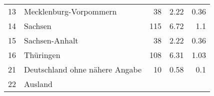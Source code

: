\begin{longtable}{lXrrr}
     13 &
     \multicolumn{1}{X}{ Mecklenburg-Vorpommern   } &


       \num{38} &
       \num[round-mode=places,round-precision=2]{2.22} &
         \num[round-mode=places,round-precision=2]{0.36} \\

     14 &
     \multicolumn{1}{X}{ Sachsen   } &


       \num{115} &
       \num[round-mode=places,round-precision=2]{6.72} &
         \num[round-mode=places,round-precision=2]{1.1} \\

     15 &
     \multicolumn{1}{X}{ Sachsen-Anhalt   } &


       \num{38} &
       \num[round-mode=places,round-precision=2]{2.22} &
         \num[round-mode=places,round-precision=2]{0.36} \\

     16 &
     \multicolumn{1}{X}{ Thüringen   } &


       \num{108} &
       \num[round-mode=places,round-precision=2]{6.31} &
         \num[round-mode=places,round-precision=2]{1.03} \\

     21 &
     \multicolumn{1}{X}{ Deutschland ohne nähere Angabe   } &


       \num{10} &
       \num[round-mode=places,round-precision=2]{0.58} &
         \num[round-mode=places,round-precision=2]{0.1} \\

     22 &
     \multicolumn{1}{X}{ Ausland   } &



\end{longtable}
